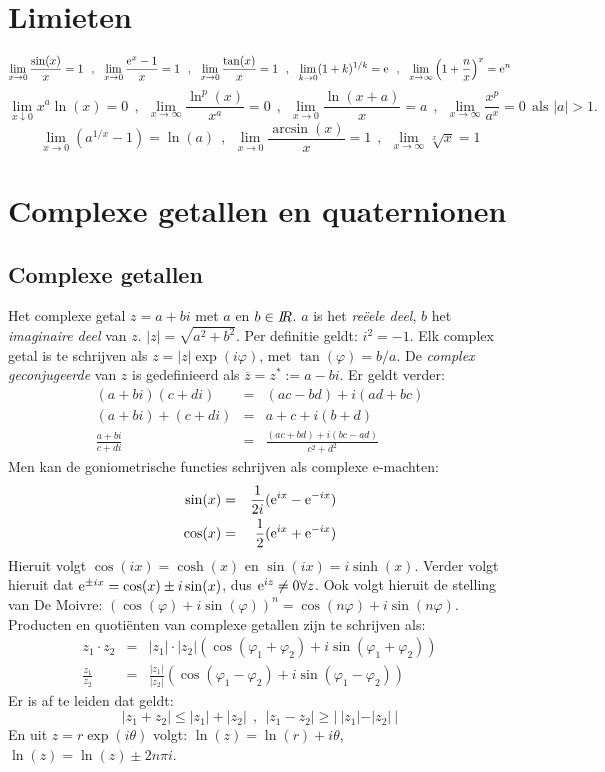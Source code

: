 \documentclass[twoside]{report}
\begin{document}
\section{Limieten}
\[
\lim_{x\rightarrow0}\frac{\sin(x)}{x}=1~~,~~
\lim_{x\rightarrow0}\frac{{\rm e}^x-1}{x}=1~~,~~
\lim_{x\rightarrow0}\frac{\tan(x)}{x}=1~~,~~
\lim_{k\rightarrow0}(1+k)^{1/k}={\rm e}~~,~~
\lim_{x\rightarrow\infty}\left(1+\frac{n}{x}\right)^x={\rm e}^n
\]
\[
\lim_{x\downarrow0}x^a\ln(x)=0~~,~~
\lim_{x\rightarrow\infty}\frac{\ln^p(x)}{x^a}=0~~,~~
\lim_{x\rightarrow0}\frac{\ln(x+a)}{x}=a~~,~~
\lim_{x\rightarrow\infty}\frac{x^p}{a^x}=0~~\mbox{als }|a|>1.
\]
\[
\lim_{x\rightarrow0}\left(a^{1/x}-1\right)=\ln(a)~~,~~
\lim_{x\rightarrow0}\frac{\arcsin(x)}{x}=1~~,~~
\lim_{x\rightarrow\infty}\sqrt[x]{x}=1
\]

\section{Complexe getallen en quaternionen}
\subsection{Complexe getallen}
Het complexe getal $z=a+bi$ met $a$ en $b\in I\hspace{-1mm}R$. $a$ is het {\it re\"eele
deel}, $b$ het {\it imaginaire deel} van $z$. $|z|=\sqrt{a^2+b^2}$. Per
definitie geldt: $i^2=-1$. Elk complex getal is te schrijven als
$z=|z|\exp(i\varphi)$, met $\tan(\varphi)=b/a$. De {\it complex geconjugeerde}
van $z$ is gedefinieerd als $\overline{z}=z^*:=a-bi$. Er geldt verder:
\begin{eqnarray*}
(a+bi)(c+di)&=&(ac-bd)+i(ad+bc)\\
(a+bi)+(c+di)&=&a+c+i(b+d)\\
\frac{a+bi}{c+di}&=&\frac{(ac+bd)+i(bc-ad)}{c^2+d^2}
\end{eqnarray*}
Men kan de goniometrische functies schrijven als complexe e-machten:
\begin{eqnarray*}
\sin(x)&=&\frac{1}{2i}({\rm e}^{ix}-{\rm e}^{-ix})\\
\cos(x)&=&\frac{1}{2}({\rm e}^{ix}+{\rm e}^{-ix})
\end{eqnarray*}
Hieruit volgt $\cos(ix)=\cosh(x)$ en $\sin(ix)=i\sinh(x)$. Verder volgt
hieruit dat ${\rm e}^{\pm ix}=\cos(x)\pm i\sin(x)$, dus
${\rm e}^{iz}\neq0\forall z$. Ook volgt hieruit de stelling van De Moivre:
$(\cos(\varphi)+i\sin(\varphi))^n=\cos(n\varphi)+i\sin(n\varphi)$.
\npar
Producten en quoti\"enten van complexe getallen zijn te schrijven als:
\begin{eqnarray*}
z_1\cdot z_2&=&|z_1|\cdot|z_2|(\cos(\varphi_1+\varphi_2)+i\sin(\varphi_1+\varphi_2))\\
\frac{z_1}{z_2}&=&\frac{|z_1|}{|z_2|}(\cos(\varphi_1-\varphi_2)+i\sin(\varphi_1-\varphi_2))
\end{eqnarray*}
Er is af te leiden dat geldt:
\[
|z_1+z_2|\leq|z_1|+|z_2|~~,~~|z_1-z_2|\geq|~|z_1|-|z_2|~|
\]
En uit $z=r\exp(i\theta)$ volgt: $\ln(z)=\ln(r)+i\theta$, $\ln(z)=\ln(z)\pm2n\pi i$.
\end{document}

